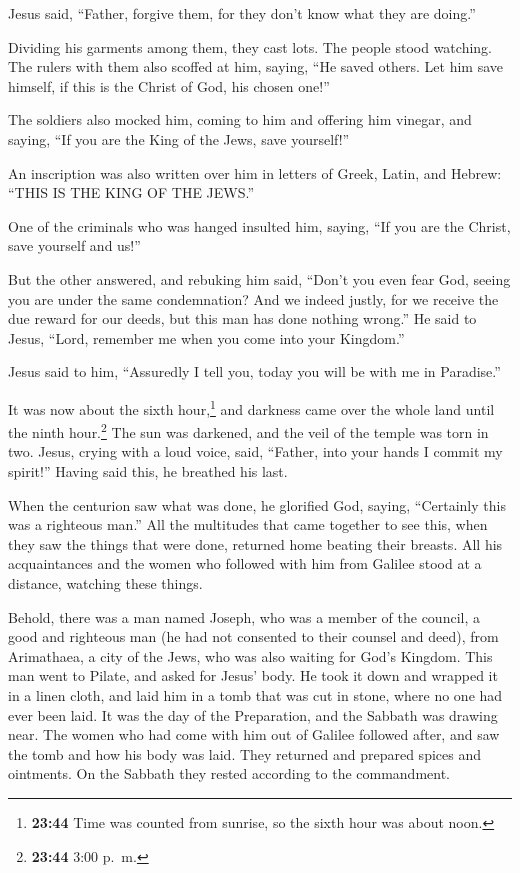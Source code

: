  Jesus said, ``Father, forgive them, for they don't know
what they are doing.''

Dividing his garments among them, they cast lots.  The
people stood watching. The rulers with them also scoffed at him, saying,
``He saved others. Let him save himself, if this is the Christ of God,
his chosen one!''

 The soldiers also mocked him, coming to him and offering
him vinegar,  and saying, ``If you are the King of the
Jews, save yourself!''

 An inscription was also written over him in letters of
Greek, Latin, and Hebrew: ``THIS IS THE KING OF THE JEWS.''

 One of the criminals who was hanged insulted him,
saying, ``If you are the Christ, save yourself and us!''

 But the other answered, and rebuking him said, ``Don't
you even fear God, seeing you are under the same condemnation?
 And we indeed justly, for we receive the due reward for
our deeds, but this man has done nothing wrong.''  He
said to Jesus, ``Lord, remember me when you come into your Kingdom.''

 Jesus said to him, ``Assuredly I tell you, today you
will be with me in Paradise.''

 It was now about the sixth hour,\footnote{\textbf{23:44}
  Time was counted from sunrise, so the sixth hour was about noon.} and
darkness came over the whole land until the ninth hour.\footnote{\textbf{23:44}
  3:00 p.~m.}  The sun was darkened, and the veil of the
temple was torn in two.  Jesus, crying with a loud voice,
said, ``Father, into your hands I commit my spirit!'' Having said this,
he breathed his last.

 When the centurion saw what was done, he glorified God,
saying, ``Certainly this was a righteous man.''  All the
multitudes that came together to see this, when they saw the things that
were done, returned home beating their breasts.  All his
acquaintances and the women who followed with him from Galilee stood at
a distance, watching these things.

 Behold, there was a man named Joseph, who was a member
of the council, a good and righteous man  (he had not
consented to their counsel and deed), from Arimathaea, a city of the
Jews, who was also waiting for God's Kingdom.  This man
went to Pilate, and asked for Jesus' body.  He took it
down and wrapped it in a linen cloth, and laid him in a tomb that was
cut in stone, where no one had ever been laid.  It was
the day of the Preparation, and the Sabbath was drawing near.
 The women who had come with him out of Galilee followed
after, and saw the tomb and how his body was laid.  They
returned and prepared spices and ointments. On the Sabbath they rested
according to the commandment.

